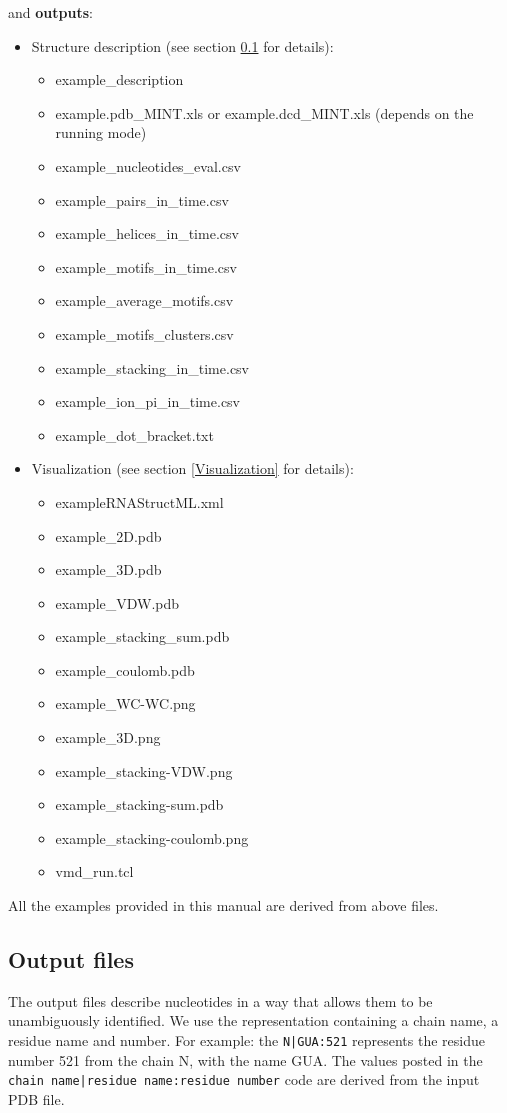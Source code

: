 \documentclass[12pt]{article}
\begin{document}
and \textbf{outputs}:
\begin{itemize}
\item Structure description (see section \ref{OutputFiles} for details):
\begin{itemize}
\item example\_description			
\item example.pdb\_MINT.xls or example.dcd\_MINT.xls (depends on the running mode)
\item example\_nucleotides\_eval.csv
\item example\_pairs\_in\_time.csv
\item example\_helices\_in\_time.csv
\item example\_motifs\_in\_time.csv
\item example\_average\_motifs.csv				
\item example\_motifs\_clusters.csv
\item example\_stacking\_in\_time.csv
\item example\_ion\_pi\_in\_time.csv
\item example\_dot\_bracket.txt
\end{itemize}
\item Visualization  (see section \ref{Visualization} for details):
\begin{itemize}
\item exampleRNAStructML.xml		
\item example\_2D.pdb				
\item example\_3D.pdb				
\item example\_VDW.pdb				
\item example\_stacking\_sum.pdb
\item example\_coulomb.pdb			
\item example\_WC-WC.png
\item example\_3D.png				
\item example\_stacking-VDW.png
\item example\_stacking-sum.pdb
\item example\_stacking-coulomb.png
\item vmd\_run.tcl
\end{itemize}
\end{itemize}

All the examples provided in this manual are derived from above files.

\subsection{Output files}\label{OutputFiles}
The output files describe nucleotides in a way that allows them to be unambiguously identified. We use the representation containing a chain name, a residue name and number. For example: the \texttt{N|GUA:521} represents the residue number 521 from the chain N, with the name GUA. The values posted in the \texttt{chain name|residue name:residue number} code are derived from the input PDB file.
\end{document}
